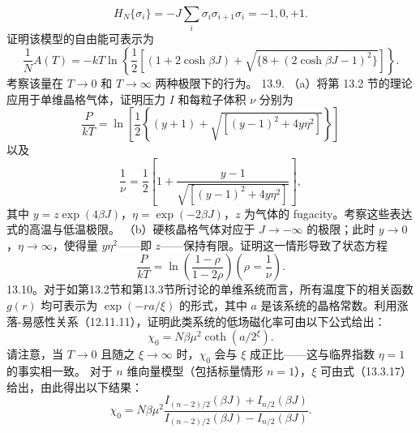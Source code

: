 \begin{equation}\tag{13.7.24}\label{eq:13.7.24}
H _ { N } \{ \sigma _ { i } \} = - J \sum _ { i } \sigma _ { i } \sigma _ { i + 1 }  \sigma _ { i } = - 1 , 0 , + 1 .
\end{equation}
证明该模型的自由能可表示为
\begin{equation}\tag{13.7.25}\label{eq:13.7.25}
\frac { 1 } { N } A ( T ) = - k T \ln \left\{ \frac { 1 } { 2 } \left[ ( 1 + 2 \cosh \beta J ) + \sqrt { \{ 8 + ( 2 \cosh \beta J - 1 ) ^{2} \} } \right] \right\} .
\end{equation}
考察该量在 \(T \to 0\) 和 \(T \to \infty\) 两种极限下的行为。
13.9. （a）将第 13.2 节的理论应用于单维晶格气体，证明压力 \(I\) 和每粒子体积 \(\nu\) 分别为
\begin{equation}\tag{13.7.26}\label{eq:13.7.26}
\frac { P } { k T } = \ln \left[ \frac { 1 } { 2 } \left\{ ( y + 1 ) + \sqrt { [ ( y - 1 ) ^{2} + 4 y \eta ^{2} ] } \right\} \right]
\end{equation}
以及
\begin{equation}\tag{13.7.27}\label{eq:13.7.27}
\frac { 1 } { \nu } = \frac { 1 } { 2 } \left[ 1 + \frac { y - 1 } { \sqrt { [ ( y - 1 ) ^{2} + 4 y \eta ^{2} ] } } \right] ,
\end{equation}
其中 \(y = z \exp(4\beta J)\)，\(\eta = \exp(-2\beta J)\)，\(z\) 为气体的 fugacity。考察这些表达式的高温与低温极限。
（b）硬核晶格气体对应于 \(J \to -\infty\) 的极限；此时 \(y \to 0\)，\(\eta \to \infty\)，使得量 \(y\eta^2\)——即 \(z\)——保持有限。证明这一情形导致了状态方程
\begin{equation}\tag{13.7.28}\label{eq:13.7.28}
{ \frac { P } { k T } } = \ln \left( { \frac { 1 - \rho } { 1 - 2 \rho } } \right)  \left( \rho = { \frac { 1 } { \nu } } \right) .
\end{equation}
13.10。对于如第13.2节和第13.3节所讨论的单维系统而言，所有温度下的相关函数 \(g(r)\) 均可表示为 \(\exp(-ra/\xi)\) 的形式，其中 \(a\) 是该系统的晶格常数。利用涨落-易感性关系（12.11.11），证明此类系统的低场磁化率可由以下公式给出：
\begin{equation}\tag{13.7.29}\label{eq:13.7.29}
\chi _ { 0 } = N \beta \mu ^{2} \coth ( a / 2 ^{\xi} ) .
\end{equation}
请注意，当 \(T \to 0\) 且随之 \(\xi \to \infty\) 时，\(\chi_0\) 会与 \(\xi\) 成正比——这与临界指数 \(\eta = 1\) 的事实相一致。
对于 \(n\) 维向量模型（包括标量情形 \(n=1\)），\(\xi\) 可由式（13.3.17）给出，由此得出以下结果：
\begin{equation}\tag{13.7.30}\label{eq:13.7.30}
\chi _ { 0 } = N \beta \mu ^{2} \frac { I _ { ( n - 2 ) / 2 } ( \beta J ) + I _ { n / 2 } ( \beta J ) } { I _ { ( n - 2 ) / 2 } ( \beta J ) - I _ { n / 2 } ( \beta J ) } .
\end{equation}
